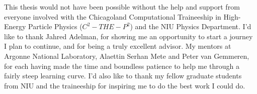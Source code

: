 This thesis would not have been possible without the help and support from everyone involved with the Chicagoland Computational Traineeship in High-Energy Particle Physics ($C^{2}-THE-P^{2}$) and the NIU Physics Department.
I'd like to thank Jahred Adelman, for showing me an opportunity to start a journey I plan to continue, and for being a truly excellent advisor.
My mentors at Argonne National Laboratory, Alaettin Serhan Mete and Peter van Gemmeren, for each having made the time and boundless patience to help me through a fairly steep learning curve.
I'd also like to thank my fellow graduate students from NIU and the traineeship for inspiring me to do the best work I could do.